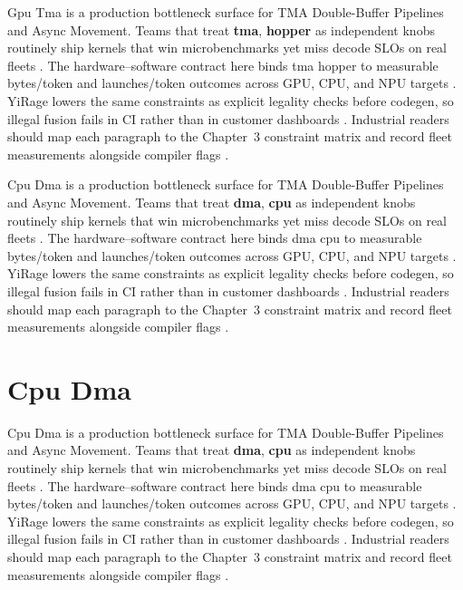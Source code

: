 Gpu Tma is a production bottleneck surface for TMA Double-Buffer Pipelines and Async Movement. Teams that treat \textbf{tma}, \textbf{hopper} as independent knobs routinely ship kernels that win microbenchmarks yet miss decode SLOs on real fleets \citep{patel2025llminference,nvidia2022hopper}. The hardware--software contract here binds tma hopper to measurable bytes/token and launches/token outcomes across GPU, CPU, and NPU targets \citep{taxbreak2026,semianalysis2024tma}. YiRage lowers the same constraints as explicit legality checks before codegen, so illegal fusion fails in CI rather than in customer dashboards \citep{memoryfloor2026,amd2024xdna}. Industrial readers should map each paragraph to the Chapter~3 constraint matrix and record fleet measurements alongside compiler flags \citep{nvidia2022hopper,amd2024aie}.

Cpu Dma is a production bottleneck surface for TMA Double-Buffer Pipelines and Async Movement. Teams that treat \textbf{dma}, \textbf{cpu} as independent knobs routinely ship kernels that win microbenchmarks yet miss decode SLOs on real fleets \citep{taxbreak2026,semianalysis2024tma}. The hardware--software contract here binds dma cpu to measurable bytes/token and launches/token outcomes across GPU, CPU, and NPU targets \citep{memoryfloor2026,amd2024xdna}. YiRage lowers the same constraints as explicit legality checks before codegen, so illegal fusion fails in CI rather than in customer dashboards \citep{nvidia2022hopper,amd2024aie}. Industrial readers should map each paragraph to the Chapter~3 constraint matrix and record fleet measurements alongside compiler flags \citep{semianalysis2024tma,dlbook}.

\section{Cpu Dma}
\label{sec:cpu_dma}

Cpu Dma is a production bottleneck surface for TMA Double-Buffer Pipelines and Async Movement. Teams that treat \textbf{dma}, \textbf{cpu} as independent knobs routinely ship kernels that win microbenchmarks yet miss decode SLOs on real fleets \citep{memoryfloor2026,amd2024xdna}. The hardware--software contract here binds dma cpu to measurable bytes/token and launches/token outcomes across GPU, CPU, and NPU targets \citep{nvidia2022hopper,amd2024aie}. YiRage lowers the same constraints as explicit legality checks before codegen, so illegal fusion fails in CI rather than in customer dashboards \citep{semianalysis2024tma,dlbook}. Industrial readers should map each paragraph to the Chapter~3 constraint matrix and record fleet measurements alongside compiler flags \citep{amd2024xdna,dao2022flashattention}.

